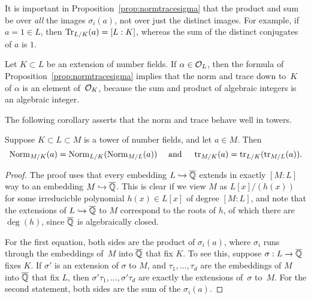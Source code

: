 \begin{warning}
	It is important in Proposition~\ref{prop:normtracesigma} that
	the product and sum be over {\em all} the images $\sigma_i(a)$,
	not over just the distinct images.  For example, if $a=1\in L$, then
	$\operatorname{Tr}_{L/K}(a) = [L:K]$, whereas the sum of the distinct conjugates
	of $a$ is $1$.
\end{warning}

\begin{remark}
	Let $K\subset L$ be an extension of number fields.  If
	$\alpha\in \mathcal{O}_L$, then the formula of
	Proposition~\ref{prop:normtracesigma} implies that the norm and trace
	down to~$K$ of $\alpha$ is an element of~$\mathcal{O}_K$, because the sum and
	product of algebraic integers is an algebraic integer.
\end{remark}

The following corollary asserts that the norm and trace behave well in
towers.
\begin{corollary}
	\label{cor:compatower}
	Suppose $K\subset L \subset M$ is a tower of number fields, and
	let $a\in M$.  Then
	$$
		\operatorname{Norm}_{M/K}(a) = \operatorname{Norm}_{L/K}(\operatorname{Norm}_{M/L}(a))
		\quad\text{ and }\quad
		\operatorname{tr}_{M/K}(a) = \operatorname{tr}_{L/K}(\operatorname{tr}_{M/L}(a)).
	$$
\end{corollary}
\begin{proof}
	The proof uses that every embedding $L\hookrightarrow \overline{\mathbb{Q}}$ extends in exactly
	$[M:L]$ way to an embedding $M\hookrightarrow \overline{\mathbb{Q}}$.  This is clear
	if we view $M$ as $L[x]/(h(x))$ for some irreducicble
	polynomial $h(x) \in L[x]$ of degree $[M:L]$, and note that
	the extensions of $L\hookrightarrow \overline{\mathbb{Q}}$ to $M$ correspond to
	the roots of $h$, of which there are $\deg(h)$, since $\overline{\mathbb{Q}}$
	is algebraically closed.
	
	For the first equation, both sides are the product of $\sigma_i(a)$,
	where $\sigma_i$ runs through the embeddings of~$M$ into $\overline{\mathbb{Q}}$
	that fix $K$.  To see this, suppose $\sigma:L\to \overline{\mathbb{Q}}$ fixes $K$.
	If $\sigma'$ is an extension of $\sigma$ to $M$, and $\tau_1,\ldots,
	\tau_d$ are the embeddings of $M$ into $\overline{\mathbb{Q}}$ that fix $L$, then
	$\sigma'\tau_1,\ldots,\sigma'\tau_d$ are exactly the extensions
	of~$\sigma$ to~$M$.  For the second statement, both sides are the
	sum of the $\sigma_i(a)$.
\end{proof}

